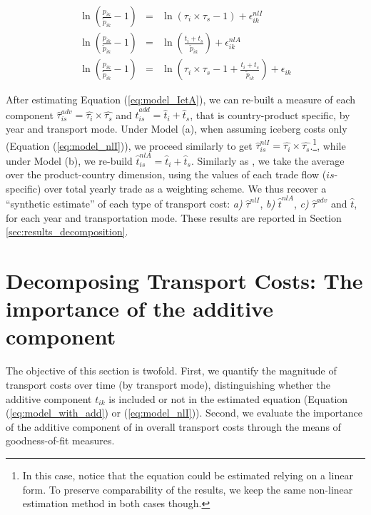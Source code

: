 \documentclass[a4paper,11pt]{article}
\begin{document}
\begin{eqnarray}
\ln\left(\frac{p_{ik}}{\widetilde{p}_{ik}}-1 \right)&=& \ln \left(\tau_{i}\times\tau_{s}-1 \right) + \epsilon^{nlI}_{ik} \label{eq:model_nlI} \\
\ln\left(\frac{p_{ik}}{\widetilde{p}_{ik}}-1 \right)&=& \ln \left(\frac{t_{i} + t_{s}}{\widetilde{p}_{ik}}\right) + \epsilon^{nlA}_{ik} \label{eq:model_nlA} \\
\ln\left(\frac{p_{ik}}{\widetilde{p}_{ik}}-1 \right)&=& \ln \left(\tau_{i} \times \tau_{s}-1 +\frac{t_{i} + t_{s}}{\widetilde{p}_{ik}}\right) + \epsilon_{ik} \label{eq:model_IetA} 
\end{eqnarray}

After estimating Equation (\ref{eq:model_IetA}), we can re-built a measure of each component $\widehat{\tau}^{adv}_{is} = \widehat{\tau_{i}} \times \widehat{\tau_{s}}$ and $\widehat{t}^{add}_{is} = \widehat{t}_{i} + \widehat{t}_{s}$, that is country-product specific, by year and transport mode. Under Model (a), when assuming iceberg costs only (Equation (\ref{eq:model_nlI})), we proceed similarly to get $\widehat{\tau}^{nlI}_{is} = \widehat{\tau_{i}} \times \widehat{\tau_{s}}$.\footnote{In this case, notice that the equation could be estimated relying on a linear form. To preserve comparability of the results, we keep the same non-linear estimation method in both cases though.}, while under Model (b), we re-build $\widehat{t}^{nlA}_{is} = \widehat{t}_{i} + \widehat{t}_{s}$. Similarly as \citet{Irrazabal_2015}, we take the average over the product-country dimension, using the values of each trade flow ($is$-specific) over total yearly trade as a weighting scheme. We thus recover a ``synthetic estimate'' of each type of transport cost: \textit{a)} $\widehat{\tau}^{nlI}$, \textit{b)} $\widehat{t}^{nlA}$, \textit{c)} $\widehat{\tau}^{adv}$ and $\widehat{t}$, for each year and transportation mode. These results are reported in Section \ref{sec:results_decomposition}.


\section{Decomposing Transport Costs: The importance of the additive component \label{sec:results_decomposition}}

The objective of this section is twofold. First, we quantify the magnitude of transport costs over time (by transport mode), distinguishing whether the additive component $t_{ik}$ is included or not in the estimated equation (Equation (\ref{eq:model_with_add}) or (\ref{eq:model_nlI})). Second, we evaluate the importance of the additive component of in overall transport costs through the means of goodness-of-fit measures.
\end{document}
